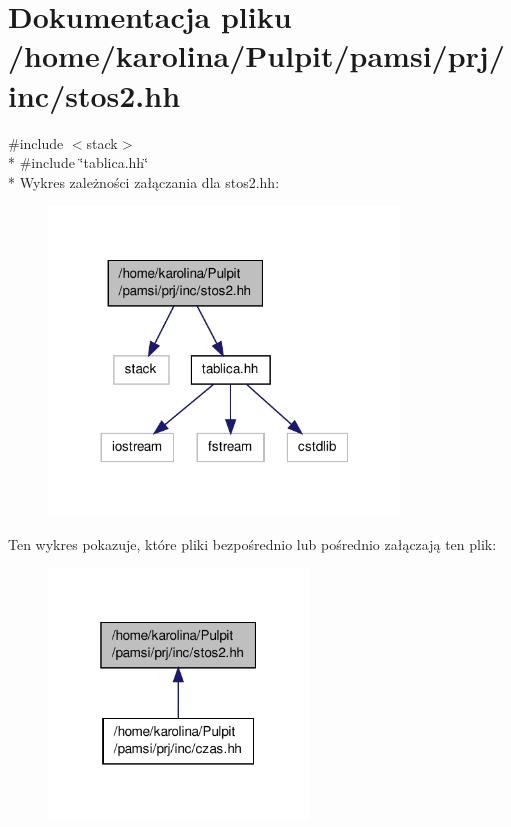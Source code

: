 \hypertarget{stos2_8hh}{\section{Dokumentacja pliku /home/karolina/\-Pulpit/pamsi/prj/inc/stos2.hh}
\label{stos2_8hh}
}
{\ttfamily \#include $<$stack$>$}\\*
{\ttfamily \#include \char`\"{}tablica.\-hh\char`\"{}}\\*
Wykres zależności załączania dla stos2.\-hh\-:\nopagebreak
\begin{figure}[H]
\begin{center}
\leavevmode
\includegraphics[width=264pt]{stos2_8hh__incl}
\end{center}
\end{figure}
Ten wykres pokazuje, które pliki bezpośrednio lub pośrednio załączają ten plik\-:
\nopagebreak
\begin{figure}[H]
\begin{center}
\leavevmode
\includegraphics[width=196pt]{stos2_8hh__dep__incl}
\end{center}
\end{figure}
